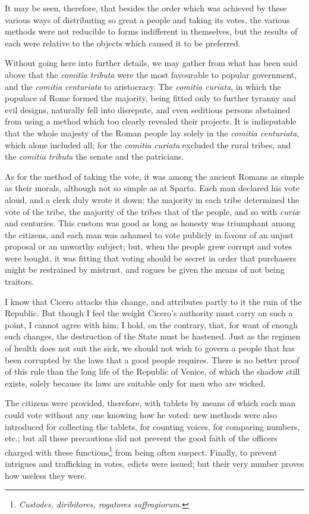 \documentclass[12pt]{report}
\begin{document}
It may be seen, therefore, that besides the order which was achieved by these various ways of distributing so great a people and taking its votes, the various methods were not reducible to forms indifferent in themselves, but the results of each were relative to the objects which caused it to be preferred.

Without going here into further details, we may gather from what has been said above that the \textit{comitia tributa} were the most favourable to popular government, and the \textit{comitia centuriata} to aristocracy. The \textit{comitia curiata}, in which the populace of Rome formed the majority, being fitted only to further tyranny and evil designs, naturally fell into disrepute, and even seditious persons abstained from using a method which too clearly revealed their projects. It is indisputable that the whole majesty of the Roman people lay solely in the \textit{comitia centuriata}, which alone included all; for the \textit{comitia curiata} excluded the rural tribes, and the \textit{comitia tributa} the senate and the patricians.

As for the method of taking the vote, it was among the ancient Romans as simple as their morals, although not so simple as at Sparta. Each man declared his vote aloud, and a clerk duly wrote it down; the majority in each tribe determined the vote of the tribe, the majority of the tribes that of the people, and so with \textit{curiæ} and centuries. This custom was good as long as honesty was triumphant among the citizens, and each man was ashamed to vote publicly in favour of an unjust proposal or an unworthy subject; but, when the people grew corrupt and votes were bought, it was fitting that voting should be secret in order that purchasers might be restrained by mistrust, and rogues be given the means of not being traitors.

I know that Cicero attacks this change, and attributes partly to it the ruin of the Republic. But though I feel the weight Cicero's authority must carry on such a point, I cannot agree with him; I hold, on the contrary, that, for want of enough such changes, the destruction of the State must be hastened. Just as the regimen of health does not suit the sick, we should not wish to govern a people that has been corrupted by the laws that a good people requires. There is no better proof of this rule than the long life of the Republic of Venice, of which the shadow still exists, solely because its laws are suitable only for men who are wicked.

The citizens were provided, therefore, with tablets by means of which each man could vote without any one knowing how he voted: new methods were also introduced for collecting the tablets, for counting voices, for comparing numbers, etc.; but all these precautions did not prevent the good faith of the officers charged with these functions\footnote{\textit{Custodes, diribitores, rogatores suffragiorum.}} from being often suspect. Finally, to prevent intrigues and trafficking in votes, edicts were issued; but their very number proves how useless they were.
\end{document}
